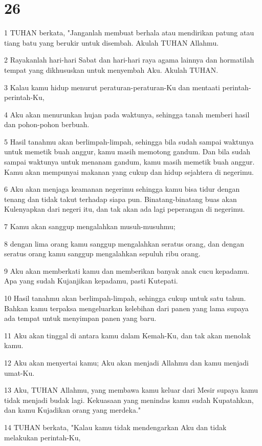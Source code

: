 \chapter{26}

\par 1 TUHAN berkata, "Janganlah membuat berhala atau mendirikan patung atau tiang batu yang berukir untuk disembah. Akulah TUHAN Allahmu.
\par 2 Rayakanlah hari-hari Sabat dan hari-hari raya agama lainnya dan hormatilah tempat yang dikhususkan untuk menyembah Aku. Akulah TUHAN.
\par 3 Kalau kamu hidup menurut peraturan-peraturan-Ku dan mentaati perintah-perintah-Ku,
\par 4 Aku akan menurunkan hujan pada waktunya, sehingga tanah memberi hasil dan pohon-pohon berbuah.
\par 5 Hasil tanahmu akan berlimpah-limpah, sehingga bila sudah sampai waktunya untuk memetik buah anggur, kamu masih memotong gandum. Dan bila sudah sampai waktunya untuk menanam gandum, kamu masih memetik buah anggur. Kamu akan mempunyai makanan yang cukup dan hidup sejahtera di negerimu.
\par 6 Aku akan menjaga keamanan negerimu sehingga kamu bisa tidur dengan tenang dan tidak takut terhadap siapa pun. Binatang-binatang buas akan Kulenyapkan dari negeri itu, dan tak akan ada lagi peperangan di negerimu.
\par 7 Kamu akan sanggup mengalahkan musuh-musuhmu;
\par 8 dengan lima orang kamu sanggup mengalahkan seratus orang, dan dengan seratus orang kamu sanggup mengalahkan sepuluh ribu orang.
\par 9 Aku akan memberkati kamu dan memberikan banyak anak cucu kepadamu. Apa yang sudah Kujanjikan kepadamu, pasti Kutepati.
\par 10 Hasil tanahmu akan berlimpah-limpah, sehingga cukup untuk satu tahun. Bahkan kamu terpaksa mengeluarkan kelebihan dari panen yang lama supaya ada tempat untuk menyimpan panen yang baru.
\par 11 Aku akan tinggal di antara kamu dalam Kemah-Ku, dan tak akan menolak kamu.
\par 12 Aku akan menyertai kamu; Aku akan menjadi Allahmu dan kamu menjadi umat-Ku.
\par 13 Aku, TUHAN Allahmu, yang membawa kamu keluar dari Mesir supaya kamu tidak menjadi budak lagi. Kekuasaan yang menindas kamu sudah Kupatahkan, dan kamu Kujadikan orang yang merdeka."
\par 14 TUHAN berkata, "Kalau kamu tidak mendengarkan Aku dan tidak melakukan perintah-Ku,
